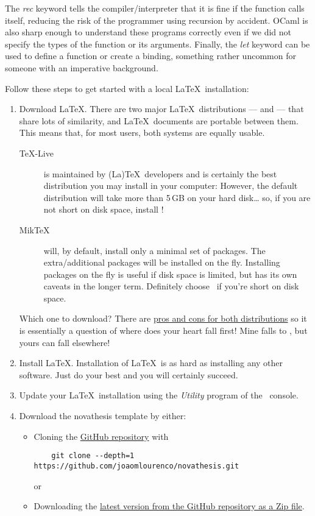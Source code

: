 The \emph{rec} keyword tells the compiler/interpreter that it is fine if the function calls itself, reducing the risk of the programmer using recursion by accident.
OCaml is also sharp enough to understand these programs correctly even if we did not specify the types of the function or its arguments.
Finally, the \emph{let} keyword can be used to define a function or create a binding, something rather uncommon for someone with an imperative background.


\iffalse
Follow these steps to get started with a local \LaTeX\ installation:

\begin{enumerate}
  \item Download \LaTeX.  There are two major \LaTeX\ distributions — \href{https://miktex.org/}{\MikTeX} and \href{https://www.tug.org/texlive/}{\TeXLive} — that share lots of similarity, and \LaTeX\ documents are portable between them. This means that, for most users, both systems are equally usable.
  \begin{description}
    \item [\TeX-Live] is maintained by (La)\TeX\ developers and is certainly the best distribution you may install in your computer:  However, the default distribution will take more than 5\,GB on your hard disk… so, if you are not short on disk space, install \TeXLive!
    \item[Mik\TeX] will, by default, install only a minimal set of packages. The extra/additional packages will be installed on the fly.  Installing packages on the fly is useful if disk space is limited, but has its own caveats in the longer term.  Definitely choose \MikTeX\ if you're short on disk space.
  \end{description}
  Which one to download?  There are \href{https://tex.stackexchange.com/questions/20036/what-are-the-advantages-of-tex-live-over-miktex}{pros and cons for both distributions} so it is essentially a question of where does your heart fall first!  Mine falls to \TeXLive, but yours can fall elsewhere!  \emojiSmile
  \item Install \LaTeX. Installation of \LaTeX\ is as hard as installing any other software.  Just do your best and you will certainly succeed. 
  \item Update your \LaTeX\ installation using the \emph{\TeXLive Utility} program of the \MikTeX\ console.
  \item Download the \gls{novathesis} template by either:
  \begin{itemize}
    \item Cloning the \href{https://github.com/joaomlourenco/novathesis}{GitHub repository} with
    \begin{verbatim}    git clone --depth=1 https://github.com/joaomlourenco/novathesis.git\end{verbatim}
    or
    \item Downloading the \href{https://github.com/joaomlourenco/novathesis/archive/main.zip}{latest version from the GitHub repository as a Zip file}.
  \end{itemize}


\end{enumerate}
